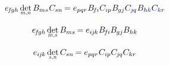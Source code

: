 \begin{otherlanguage}{russian}
\[
e_{\hspace{-0.25ex}f\hspace{-0.2ex}gh} \hspace{.33ex} \underset{\raisebox{.15em}{\scalebox{0.7}{$m$,$n$}}}{\operatorname{det}} \, B_{m\mathcolor{blue}{s}} \hspace{.1ex} C_{\mathcolor{blue}{s}n} \hspace{-0.2ex}
= e_{pqr} \hspace{.1ex} B_{\hspace{-0.25ex}f\hspace{-0.1ex}\mathcolor{blue}{i}} C_{\mathcolor{blue}{i}p} \hspace{.1ex} B_{\hspace{-0.1ex}g\mathcolor{blue}{j}} C_{\hspace{-0.1ex}\mathcolor{blue}{j}\hspace{-0.1ex}q} \hspace{.1ex} B_{h\mathcolor{blue}{k}} C_{\mathcolor{blue}{k}r}
\hspace{-0.2ex}
\]

\[
e_{\hspace{-0.25ex}f\hspace{-0.2ex}gh} \hspace{.33ex} \underset{\raisebox{.15em}{\scalebox{0.7}{$m$,$s$}}}{\operatorname{det}} \, B_{ms} \hspace{-0.2ex}
= e_{i\hspace{-0.1ex}j\hspace{-0.1ex}k} \hspace{.1ex} B_{\hspace{-0.25ex}f\hspace{-0.1ex}i} B_{\hspace{-0.1ex}gj} B_{hk}
\hspace{-0.2ex}
\]

\[
e_{i\hspace{-0.1ex}j\hspace{-0.1ex}k} \hspace{.33ex} \underset{\raisebox{.15em}{\scalebox{0.7}{$s$,$n$}}}{\operatorname{det}} \, C_{sn} \hspace{-0.2ex}
= e_{pqr} \hspace{.1ex} C_{ip} C_{\hspace{-0.1ex}j\hspace{-0.1ex}q} C_{kr}
\hspace{-0.2ex}
\]


\end{otherlanguage}
